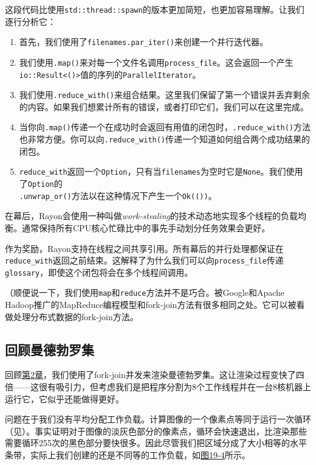 这段代码比使用\texttt{std::thread::spawn}的版本更加简短，也更加容易理解。让我们逐行分析它：
\begin{enumerate}
    \item 首先，我们使用了\texttt{filenames.par\_iter()}来创建一个并行迭代器。
    \item 我们使用\texttt{.map()}来对每一个文件名调用\texttt{process\_file}。这会返回一个产生\\
    \texttt{io::Result<()>}值的序列的\texttt{ParallelIterator}。
    \item 我们使用\texttt{.reduce\_with()}来组合结果。这里我们保留了第一个错误并丢弃剩余的内容。如果我们想累计所有的错误，或者打印它们，我们可以在这里完成。
    \item 当你向\texttt{.map()}传递一个在成功时会返回有用值的闭包时，\texttt{.reduce\_with()}方法也非常方便。你可以向\texttt{.reduce\_with()}传递一个知道如何组合两个成功结果的闭包。
    \item \texttt{reduce\_with}返回一个\texttt{Option}，只有当\texttt{filenames}为空时它是\texttt{None}。我们使用了\texttt{Option}的\\
    \texttt{.unwrap\_or()}方法以在这种情况下产生一个\texttt{Ok(())}。
\end{enumerate}

在幕后，Rayon会使用一种叫做\emph{work-stealing}的技术动态地实现多个线程的负载均衡。通常保持所有CPU核心忙碌比中的事先手动划分任务效果会更好。

作为奖励，Rayon支持在线程之间共享引用。所有幕后的并行处理都保证在\texttt{reduce\_with}返回之前结束。这解释了为什么我们可以向\texttt{process\_file}传递\texttt{glossary}，即使这个闭包将会在多个线程间调用。

（顺便说一下，我们使用\texttt{map}和\texttt{reduce}方法并不是巧合。被Google和Apache Hadoop推广的MapReduce编程模型和fork-join方法有很多相同之处。它可以被看做处理分布式数据的fork-join方法。

\subsection{回顾曼德勃罗集}
回顾\hyperref[ch02]{第2章}，我们使用了fork-join并发来渲染曼德勃罗集。这让渲染过程变快了四倍——这很有吸引力，但考虑我们是把程序分割为8个工作线程并在一台8核机器上运行它，它似乎还能做得更好。

问题在于我们没有平均分配工作负载。计算图像的一个像素点等同于运行一次循环（见）。事实证明对于图像的淡灰色部分的像素点，循环会快速退出，比渲染那些需要循环255次的黑色部分要快很多。因此尽管我们把区域分成了大小相等的水平条带，实际上我们创建的还是不同等的工作负载，如\hyperref[f19-4]{图19-4}所示。

